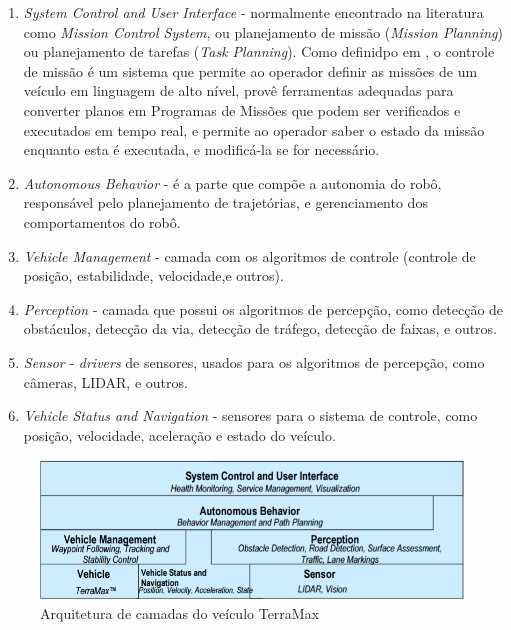 \begin{enumerate}
  \item \textit{System Control and User Interface} - normalmente encontrado na
  literatura como \textit{Mission Control System}, ou planejamento de
missão (\textit{Mission Planning}) ou planejamento de tarefas (\textit{Task
Planning}). Como definidpo em \cite{fryxell1996navigation}, o controle de
missão é um sistema que permite ao operador definir as missões de um veículo em
linguagem de alto nível, provê ferramentas adequadas para converter planos em
Programas de Missões que podem ser verificados e executados em tempo real, e
permite ao operador saber o estado da missão enquanto esta é executada, e
modificá-la se for necessário.

  \item \textit{Autonomous Behavior} - é a parte que compõe a autonomia do robô,
  responsável pelo planejamento de trajetórias, e gerenciamento dos
  comportamentos do robô.
  
  \item \textit{Vehicle Management} - camada com os algoritmos de controle
  (controle de posição, estabilidade, velocidade,e  outros).
  
  \item \textit{Perception} - camada que possui os algoritmos de percepção, como
  detecção de obstáculos, detecção da via, detecção de tráfego, detecção de
  faixas, e outros.
  
  \item \textit{Sensor} - \textit{drivers} de sensores, usados para os
  algoritmos de percepção, como câmeras, LIDAR, e outros.
  
  \item \textit{Vehicle Status and Navigation} - sensores para o sistema de
  controle, como posição, velocidade, aceleração e estado do veículo.
\end{enumerate}
 
\begin{figure}[!ht]
\centering
\includegraphics[width=\columnwidth]{figs/camadas.jpg}
\caption{Arquitetura de camadas do veículo TerraMax}
\label{fig:camadas}
\end{figure}

